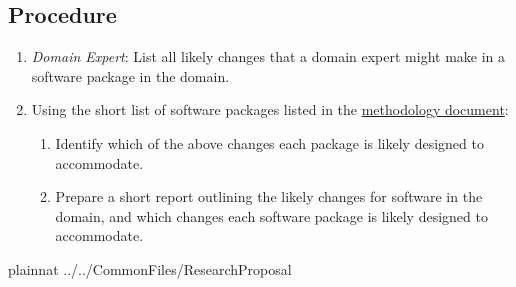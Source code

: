 \documentclass[letterpaper,cleveref]{lipics-v2019}
\theoremstyle{definition}
\begin{document}
\subsection {Procedure}

\begin{enumerate}
	\item \textit{Domain Expert}: List all likely changes that a domain expert might make in a software package in the domain.
	\item Using the short list of software packages listed in the  \href{https://github.com/smiths/AIMSS/blob/master/StateOfPractice/Methodology/Methodology.pdf}{methodology document}:
	\begin{enumerate}
		\item Identify which of the above changes each package is likely designed to accommodate.
		\item Prepare a short report outlining the likely changes for software in the domain, and which changes each software package is likely designed to accommodate.
	\end{enumerate}
\end{enumerate}

\newpage

 {plainnat}
 {../../CommonFiles/ResearchProposal}
\end{document}
